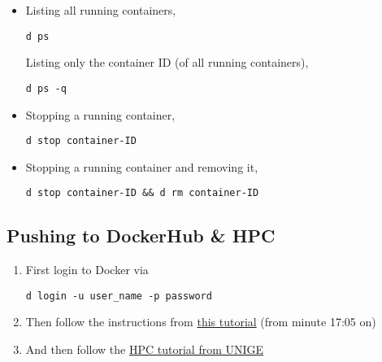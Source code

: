 \documentclass[12pt, a4paper]{article}
\numberwithin{equation}{section}
\theoremstyle{definition}
\theoremstyle{definition}
\begin{document}
	\begin{itemize} 
		
		\item Listing all running containers, 
		
		\begin{lstlisting}[style=mystylebash, label=alg:docker__check_all_contain, xleftmargin=\parindent]
			d ps
		\end{lstlisting}
		
		Listing only the container ID (of all running containers),
		
		\begin{lstlisting}[style=mystylebash, label=alg:docker__contains_ids, xleftmargin=\parindent]
			d ps -q
		\end{lstlisting}
		
		\item Stopping a running container,
		
		\begin{lstlisting}[style=mystylebash, label=alg:docker__stop_contain, xleftmargin=\parindent]
			d stop container-ID
		\end{lstlisting}
		
		\item Stopping a running container and removing it,
		
		\begin{lstlisting}[style=mystylebash, label=alg:docker__stop_rem_contain, xleftmargin=\parindent]
			d stop container-ID && d rm container-ID
		\end{lstlisting}
		
	\end{itemize} 
	
	\subsection{Pushing to DockerHub \& HPC}
	
	\begin{enumerate}
		\item First login to Docker via 
		
		\begin{lstlisting}[style=mystylebash, label=alg:docker_login, xleftmargin=\parindent]
			d login -u user_name -p password
		\end{lstlisting}
		
		\item Then follow the instructions from  \href{https://www.youtube.com/watch?v=iqqDU2crIEQ&t=1002s}{this tutorial} (from minute 17:05 on)
		
		\item And then follow the \href{https://doc.eresearch.unige.ch/hpc/applications_and_libraries?s[]=docker}{HPC tutorial from UNIGE}
		
	\end{enumerate}
	
\end{document}
